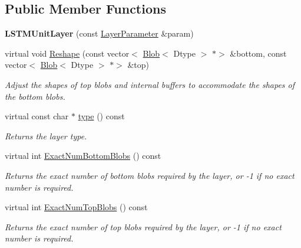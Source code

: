 \subsection*{Public Member Functions}
\begin{DoxyCompactItemize}
\item 
\mbox{\label{classcaffe_1_1_l_s_t_m_unit_layer_aa8eb86f949a93c724c6ed89a601aa4e0}} 
{\bfseries L\+S\+T\+M\+Unit\+Layer} (const \mbox{\hyperlink{classcaffe_1_1_layer_parameter}{Layer\+Parameter}} \&param)
\item 
virtual void \mbox{\hyperlink{classcaffe_1_1_l_s_t_m_unit_layer_a795bd455f4635e876de32323e9cee96d}{Reshape}} (const vector$<$ \mbox{\hyperlink{classcaffe_1_1_blob}{Blob}}$<$ Dtype $>$ $\ast$$>$ \&bottom, const vector$<$ \mbox{\hyperlink{classcaffe_1_1_blob}{Blob}}$<$ Dtype $>$ $\ast$$>$ \&top)
\begin{DoxyCompactList}\small\item\em Adjust the shapes of top blobs and internal buffers to accommodate the shapes of the bottom blobs. \end{DoxyCompactList}\item 
\mbox{\label{classcaffe_1_1_l_s_t_m_unit_layer_a684fc0eb2d2277651b26609ec7314747}} 
virtual const char $\ast$ \mbox{\hyperlink{classcaffe_1_1_l_s_t_m_unit_layer_a684fc0eb2d2277651b26609ec7314747}{type}} () const
\begin{DoxyCompactList}\small\item\em Returns the layer type. \end{DoxyCompactList}\item 
virtual int \mbox{\hyperlink{classcaffe_1_1_l_s_t_m_unit_layer_a087f5f5b0e6c50d98e7a7d04aa35f1b9}{Exact\+Num\+Bottom\+Blobs}} () const
\begin{DoxyCompactList}\small\item\em Returns the exact number of bottom blobs required by the layer, or -\/1 if no exact number is required. \end{DoxyCompactList}\item 
virtual int \mbox{\hyperlink{classcaffe_1_1_l_s_t_m_unit_layer_a5f56fd304b6581697cbf309ebb8bc9b7}{Exact\+Num\+Top\+Blobs}} () const
\begin{DoxyCompactList}\small\item\em Returns the exact number of top blobs required by the layer, or -\/1 if no exact number is required. \end{DoxyCompactList}\item 

\end{DoxyCompactItemize}
